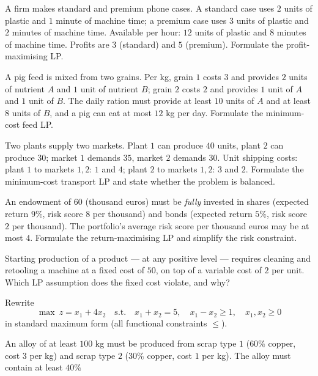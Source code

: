 \begin{problems}
  \item A firm makes standard and premium phone cases. A standard case
        uses $2$ units of plastic and $1$ minute of machine time; a
        premium case uses $3$ units of plastic and $2$ minutes of machine
        time. Available per hour: $12$ units of plastic and $8$ minutes of
        machine time. Profits are $3$ (standard) and $5$ (premium).
        Formulate the profit-maximising LP.
  \item A pig feed is mixed from two grains. Per kg, grain $1$ costs $3$
        and provides $2$ units of nutrient $A$ and $1$ unit of nutrient
        $B$; grain $2$ costs $2$ and provides $1$ unit of $A$ and $1$
        unit of $B$. The daily ration must provide at least $10$ units of
        $A$ and at least $8$ units of $B$, and a pig can eat at most $12$
        kg per day. Formulate the minimum-cost feed LP.
  \item Two plants supply two markets. Plant $1$ can produce $40$ units,
        plant $2$ can produce $30$; market $1$ demands $35$, market $2$
        demands $30$. Unit shipping costs: plant $1$ to markets $1,2$:
        $1$ and $4$; plant $2$ to markets $1,2$: $3$ and $2$. Formulate
        the minimum-cost transport LP and state whether the problem is
        balanced.
  \item An endowment of $60$ (thousand euros) must be \emph{fully}
        invested in shares (expected return $9\%$, risk score $8$ per
        thousand) and bonds (expected return $5\%$, risk score $2$ per
        thousand). The portfolio's average risk score per thousand euros
        may be at most $4$. Formulate the return-maximising LP and
        simplify the risk constraint.
  \item Starting production of a product — at any positive level —
        requires cleaning and retooling a machine at a fixed cost of
        $50$, on top of a variable cost of $2$ per unit. Which LP
        assumption does the fixed cost violate, and why?
  \item Rewrite
        \[
          \max\ z=x_1+4x_2
          \quad\text{s.t.}\quad
          x_1+x_2=5,\quad x_1-x_2\ge 1,\quad x_1,x_2\ge 0
        \]
        in standard maximum form (all functional constraints $\le$).
  \item An alloy of at least $100$ kg must be produced from scrap type
        $1$ ($60\%$ copper, cost $3$ per kg) and scrap type $2$ ($30\%$
        copper, cost $1$ per kg). The alloy must contain at least $40\%$

\end{problems}
